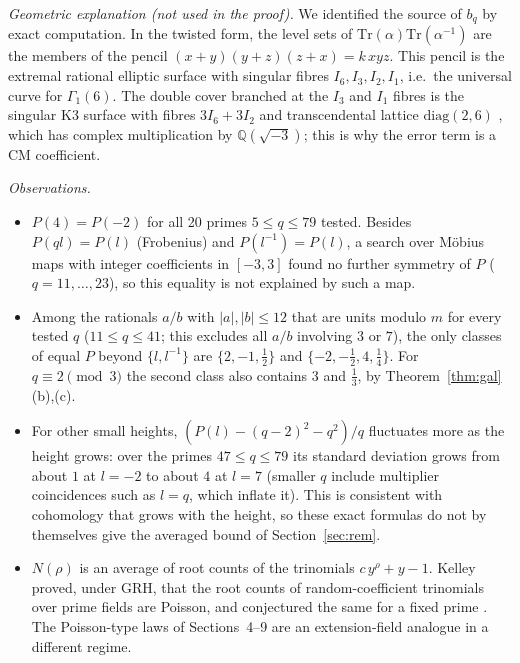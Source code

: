 \emph{Geometric explanation (not used in the proof).} We identified the source of $b_q$ by exact computation. In the twisted form, the level sets of $\mathrm{Tr}(\alpha)\mathrm{Tr}(\alpha^{-1})$ are the members of the pencil
$(x+y)(y+z)(z+x)=k\,xyz$. This pencil is the extremal rational elliptic surface with singular fibres $I_6,I_3,I_2,I_1$, i.e.\ the universal curve for $\Gamma_1(6)$.
The double cover branched at the $I_3$ and $I_1$ fibres is the singular K3 surface with fibres $3I_6+3I_2$ and transcendental lattice $\mathrm{diag}(2,6)$ \cite{HS},
which has complex multiplication by $\mathbb Q(\sqrt{-3})$; this is why the error term is a CM coefficient.

\emph{Observations.}
\begin{itemize}
\item $P(4)=P(-2)$ for all 20 primes $5\le q\le79$ tested. Besides $P(ql)=P(l)$ (Frobenius) and $P(l^{-1})=P(l)$, a search over M\"obius maps with integer coefficients in $[-3,3]$ found no further symmetry of $P$ ($q=11,\dots,23$), so this equality is not explained by such a map.
\item Among the rationals $a/b$ with $|a|,|b|\le12$ that are units modulo $m$ for every tested $q$ ($11\le q\le41$; this excludes all $a/b$ involving $3$ or $7$), the only classes of equal $P$ beyond $\{l,l^{-1}\}$ are $\{2,-1,\tfrac12\}$ and $\{-2,-\tfrac12,4,\tfrac14\}$. For $q\equiv2\pmod3$ the second class also contains $3$ and $\tfrac13$, by Theorem~\ref{thm:gal}(b),(c).
\item For other small heights, $(P(l)-(q-2)^2-q^2)/q$ fluctuates more as the height grows: over the primes $47\le q\le79$ its standard deviation grows from about $1$ at $l=-2$ to about $4$ at $l=7$ (smaller $q$ include multiplier coincidences such as $l=q$, which inflate it). This is consistent with cohomology that grows with the height, so these exact formulas do not by themselves give the averaged bound of Section~\ref{sec:rem}.
\item $N(\rho)$ is an average of root counts of the trinomials $c\,y^\rho+y-1$. Kelley proved, under GRH, that the root counts of random-coefficient trinomials over prime fields are Poisson, and conjectured the same for a fixed prime \cite{Ke,KO,BCR}. The Poisson-type laws of Sections~4--9 are an extension-field analogue in a different regime.
\end{itemize}
